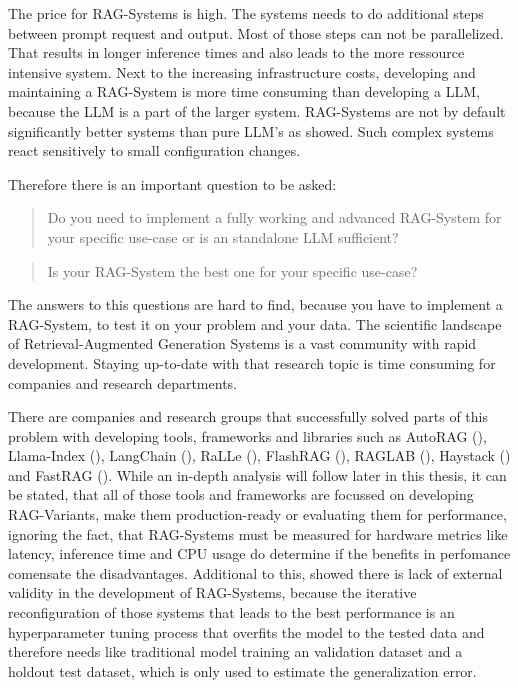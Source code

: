 The price for RAG-Systems is high. The systems needs to do additional steps between prompt request and output. Most of those steps can not be parallelized. That results in longer inference times and also leads to the more ressource intensive system. Next to the increasing infrastructure costs, developing and maintaining a RAG-System is more time consuming than developing a LLM, because the LLM is a part of the larger system. RAG-Systems are not by default significantly better systems than pure LLM's as \citet{Simon.10112024} showed. Such complex systems react sensitively to small configuration changes.

Therefore there is an important question to be asked: 
\begin{quotation}
    Do you need to implement a fully working and advanced RAG-System for your specific use-case or is an standalone LLM sufficient?
\end{quotation}
\begin{quotation}
    Is your RAG-System the best one for your specific use-case?
\end{quotation}

The answers to this questions are hard to find, because you have to implement a RAG-System, to test it on your problem and your data. The scientific landscape of Retrieval-Augmented Generation Systems is a vast community with rapid development. Staying up-to-date with that research topic is time consuming for companies and research departments. 

There are companies and research groups that successfully solved parts of this problem with developing tools, frameworks and libraries such as AutoRAG (\citeyear{AutoRAG}), Llama-Index (\citeyear{Liu_LlamaIndex_2022}), LangChain (\citeyear{Chase_LangChain_2022}), RaLLe (\citeyear{ralle}), FlashRAG (\citeyear{FlashRAG}), RAGLAB (\citeyear{zhang-etal-2024-raglab}), Haystack (\citeyear{Pietsch_Haystack_the_end-to-end_2019}) and FastRAG (\citeyear{Izsak_fastRAG_Efficient_Retrieval_2023}). While an in-depth analysis will follow later in this thesis, it can be stated, that all of those tools and frameworks are focussed on developing RAG-Variants, make them production-ready or evaluating them for performance, ignoring the fact, that RAG-Systems must be measured for hardware metrics like latency, inference time and CPU usage do determine if the benefits in perfomance comensate the disadvantages. Additional to this, \citet{Simon.10112024} showed there is lack of external validity in the development of RAG-Systems, because the iterative reconfiguration of those systems that leads to the best performance is an hyperparameter tuning process that overfits the model to the tested data and therefore needs like traditional model training an validation dataset and a holdout test dataset, which is only used to estimate the generalization error.


